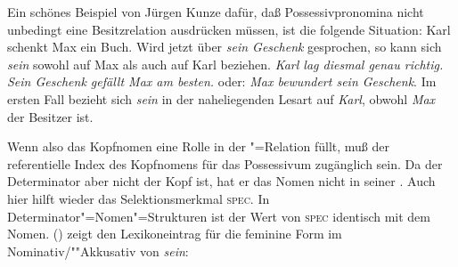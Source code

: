 Ein schönes Beispiel von Jürgen Kunze dafür, 
daß Possessivpronomina nicht unbedingt eine Besitzrelation ausdrücken müssen,
ist die folgende Situation: Karl schenkt Max ein Buch.
Wird jetzt über \emph{sein Geschenk} gesprochen, so kann sich \emph{sein} sowohl auf
Max als auch auf Karl beziehen. \emph{Karl lag diesmal genau richtig. Sein Geschenk
gefällt Max am besten.} oder: \emph{Max bewundert sein Geschenk}.
Im ersten Fall bezieht sich \emph{sein} in der naheliegenden Lesart
auf \emph{Karl}, obwohl \emph{Max} der Besitzer ist.

Wenn also das Kopfnomen eine Rolle in der "=Relation füllt, muß der
referentielle Index des Kopfnomens für das Possessivum zugänglich sein. Da der Determinator
aber nicht der Kopf ist, hat er das Nomen nicht in seiner \subcatl. Auch hier hilft
wieder das Selektionsmerkmal \textsc{spec}. In Determinator"=Nomen"=Strukturen
ist der Wert von \textsc{spec} identisch mit dem Nomen. () zeigt den Lexikoneintrag
für die feminine Form im Nominativ/""Akkusativ von \emph{sein}:

